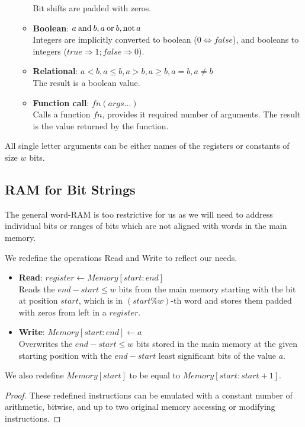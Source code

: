 \begin{enumerate}
\begin{itemize}
		Bit shifts are padded with zeros.
		\item \textbf{Boolean}: $a \mathbin{\textrm{and}} b, a \mathbin{\textrm{or}} b, \mathord{\textrm{not}\,} a$ \\
		Integers are implicitly converted to boolean ($0 \Leftrightarrow false$), and booleans to integers ($true \Rightarrow 1; false \Rightarrow 0$).
		\item \textbf{Relational}: $a < b, a \le b, a > b, a \ge b, a = b, a \ne b$ \\
		The result is a boolean value.
		\item \textbf{Function call}: $fn(args\ldots)$ \\
		Calls a function $fn$, provides it required number of arguments.
		The result is the value returned by the function.
	\end{itemize}
\end{enumerate}
All single letter arguments can be either names of the registers or constants of size $w$ bits.

\subsection{RAM for Bit Strings}

The general word-RAM is too restrictive for us as we will need to address individual bits or ranges of bits which are not aligned with words in the main memory.

\begin{lemma}
	We redefine the operations Read and Write to reflect our needs.
	
	\begin{itemize}
		\item \textbf{Read}: $register \gets Memory[start:end]$ \\
		Reads the $end - start \le w$ bits from the main memory starting with the bit at position $start$, which is in $(start \% w)$-th word and stores them padded with zeros from left in a $register$.
		\item \textbf{Write}: $Memory[start:end] \gets a$ \\
		Overwrites the $end - start \le w$ bits stored in the main memory at the given starting position with the $end - start$ least significant bits of the value $a$.
	\end{itemize}
	
	We also redefine $Memory[start]$ to be equal to $Memory[start:start + 1]$.
\end{lemma}
\begin{proof}
	These redefined instructions can be emulated with a constant number of arithmetic, bitwise, and up to two original memory accessing or modifying instructions.
\end{proof}

